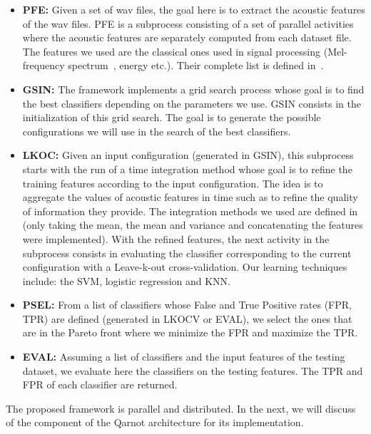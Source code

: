 \documentclass[10pt, conference, compsocconf]{IEEEtran}
\begin{document}
\begin{itemize}

\item {\bf PFE:} Given a set of wav files, the goal here is to extract the acoustic features of the wav files. PFE is a subprocess 
consisting of a set of parallel activities where the acoustic features are separately computed from each dataset file. 
The features we used are the classical ones used in signal processing (Mel-frequency spectrum~\cite{Davis:1990:CPR:108235.108239}, 
energy etc.). Their complete list is defined in~\cite{pyAudioAnalysis}. 

\item {\bf GSIN:} The framework implements a grid search process whose goal is to find the best classifiers depending on the 
parameters we use. GSIN consists in the initialization of this grid search. The goal is to generate the possible configurations 
we will use in the search of the best classifiers. 

\item {\bf LKOC:} Given an input configuration (generated in GSIN), this subprocess starts with the run of a 
time integration method whose goal is to refine the training features according to the input configuration. The idea is 
to aggregate the values of acoustic features in time such as to refine the quality of information they provide. The integration 
methods we used are defined in~\cite{DBLP:journals/taslp/JoderER09} (only taking the mean, the mean and variance and concatenating the features were implemented). With the refined features, the next activity in the subprocess consists in evaluating the classifier corresponding to the current configuration with a Leave-k-out cross-validation. Our learning techniques include: the SVM, logistic regression and KNN. 

\item {\bf PSEL:} From a list of classifiers whose False and True Positive rates (FPR, TPR) are defined (generated in LKOCV or EVAL), we select the ones that are in the Pareto front where we minimize the FPR and maximize the TPR.

\item {\bf EVAL:}  Assuming a list of classifiers and the input features of the testing dataset, we evaluate here the classifiers on the testing features. The TPR and FPR of each classifier are returned.

\end{itemize}

The proposed framework is parallel and distributed. In the next, we will discuss of the component of the Qarnot architecture for 
its implementation.
\end{document}
